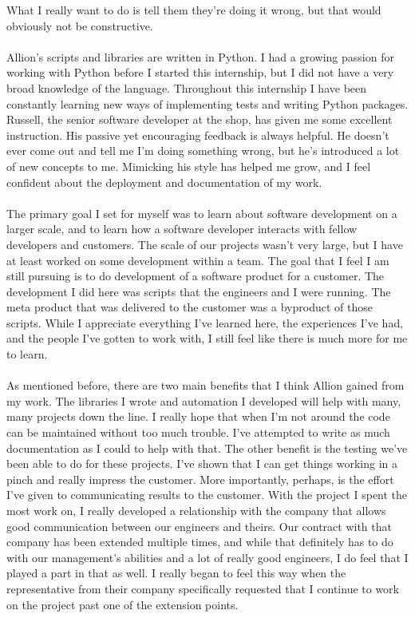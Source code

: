 \documentclass{article}
\begin{document}
What I really want to do is tell them they're doing it wrong, but that would
obviously not be constructive.\\
\\
Allion's scripts and libraries are written in Python. I had a growing passion
for working with Python before I started this internship, but I did not have a
very broad knowledge of the language. Throughout this internship I have been
constantly learning new ways of implementing tests and writing Python packages.
Russell, the senior software developer at the shop, has given me some excellent
instruction. His passive yet encouraging feedback is always helpful. He doesn't
ever come out and tell me I'm doing something wrong, but he's introduced a lot
of new concepts to me. Mimicking his style has helped me grow, and I feel
confident about the deployment and documentation of my work.\\
\\
The primary goal I set for myself was to learn about software development on a
larger scale, and to learn how a software developer interacts with fellow
developers and customers. The scale of our projects wasn't very large, but I
have at least worked on some development within a team. The goal that I feel I
am still pursuing is to do development of a software product for a customer. The
development I did here was scripts that the engineers and I were running. The
meta product that was delivered to the customer was a byproduct of those
scripts. While I appreciate everything I've learned here, the experiences I've
had, and the people I've gotten to work with, I still feel like there is much
more for me to learn.\\
\\
As mentioned before, there are two main benefits that I think Allion gained
from my work. The libraries I wrote and automation I developed will help with
many, many projects down the line. I really hope that when I'm not around the
code can be maintained without too much trouble. I've attempted to write as much
documentation as I could to help with that. The other benefit is the testing we've
been able to do for these projects. I've shown that I can get things working in
a pinch and really impress the customer. More importantly, perhaps, is the
effort I've given to communicating results to the customer. With the project I
spent the most work on, I really developed a relationship with the company that
allows good communication between our engineers and theirs. Our contract with
that company has
been extended multiple times, and while that definitely has to do with our
management's abilities and a lot of really good engineers, I do feel that I
played a part in that as well. I really began to feel this way when the
representative from their company specifically requested that I continue to
work on the project past one of the extension points.
\end{document}

